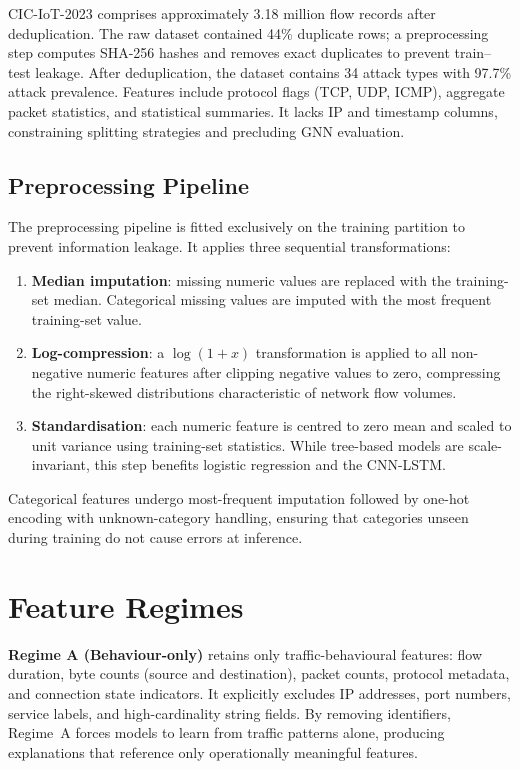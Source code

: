 \documentclass[12pt,a4paper]{report}
\begin{document}
CIC-IoT-2023 \cite{cic2023} comprises approximately 3.18 million flow records after deduplication. The raw dataset contained 44\% duplicate rows; a preprocessing step computes SHA-256 hashes and removes exact duplicates to prevent train--test leakage. After deduplication, the dataset contains 34 attack types with 97.7\% attack prevalence. Features include protocol flags (TCP, UDP, ICMP), aggregate packet statistics, and statistical summaries. It lacks IP and timestamp columns, constraining splitting strategies and precluding GNN evaluation.

\subsection{Preprocessing Pipeline}
\label{sec:preprocess}

The preprocessing pipeline is fitted exclusively on the training partition to prevent information leakage. It applies three sequential transformations:

\begin{enumerate}
  \item \textbf{Median imputation}: missing numeric values are replaced with the training-set median. Categorical missing values are imputed with the most frequent training-set value.
  \item \textbf{Log-compression}: a $\log(1 + x)$ transformation is applied to all non-negative numeric features after clipping negative values to zero, compressing the right-skewed distributions characteristic of network flow volumes.
  \item \textbf{Standardisation}: each numeric feature is centred to zero mean and scaled to unit variance using training-set statistics. While tree-based models are scale-invariant, this step benefits logistic regression and the CNN-LSTM.
\end{enumerate}

Categorical features undergo most-frequent imputation followed by one-hot encoding with unknown-category handling, ensuring that categories unseen during training do not cause errors at inference.

\section{Feature Regimes}
\label{sec:regimes}

\textbf{Regime A (Behaviour-only)} retains only traffic-behavioural features: flow duration, byte counts (source and destination), packet counts, protocol metadata, and connection state indicators. It explicitly excludes IP addresses, port numbers, service labels, and high-cardinality string fields. By removing identifiers, Regime~A forces models to learn from traffic patterns alone, producing explanations that reference only operationally meaningful features.
\end{document}
